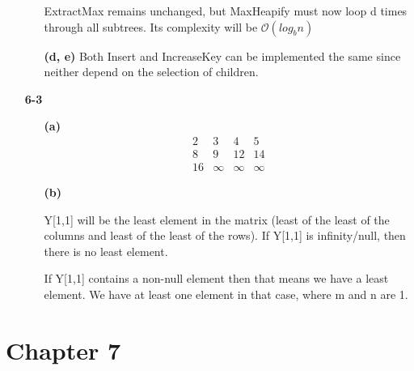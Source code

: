 \documentclass{article}
\begin{document}
\begin{enumerate}
\begin{enumerate}
	ExtractMax remains unchanged, but MaxHeapify must now loop d times through
	all subtrees. Its complexity will be $\mathcal{O}(log_bn)$

	\item[\textbf{(d, e)}]
	Both Insert and IncreaseKey can be implemented the same since neither depend
	on the selection of children.

	\end{enumerate}

\item[\textbf{6-3}]

	\begin{enumerate}
	\item[\textbf{(a)}]
	\[ \begin{matrix}
	2 & 3 & 4 & 5 \\
	8 & 9 & 12 & 14 \\
	16 & \infty & \infty & \infty
	\end{matrix} \]

	\item[\textbf{(b)}]

	Y[1,1] will be the least element in the matrix (least of the least of the
	columns and least of the least of the rows). If Y[1,1] is infinity/null, then
	there is no least element.

	If Y[1,1] contains a non-null element then that means we have a least
	element. We have at least one element in that case, where m and n are 1.

	\end{enumerate}


\end{enumerate}

\section*{Chapter 7}
\end{document}
